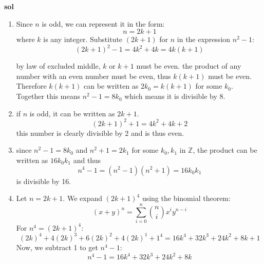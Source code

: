 \documentclass{article}
\begin{document}
\begin{enumerate}
\textbf{sol}
\begin{enumerate}
    \item Since $n$ is odd, we can represent it in the form:$$n = 2k + 1$$where $k$ is any integer. Substitute $(2k + 1)$ for $n$ in the expression $n^2 - 1$:$$(2k + 1)^2 - 1 = 4k^2+4k = 4k(k+1)$$
    
    by law of excluded middle, \(k\) or \(k+1\) must be even. the product of any number with an even number must be even, thus \(k(k+1)\) must be even. Therefore \(k(k+1)\) can be written as \(2k_0 = k(k+1)\) for some \(k_0\). Together this means \(n^2-1 = 8k_0\) which means it is divisible by \(8\). 

    \item if \(n\) is odd, it can be written as \(2k+1\). 
    \begin{equation}
        (2k+1)^2+1 = 4k^2 + 4k + 2
    \end{equation}
    this number is clearly divisible by 2 and is thus even.
    \item 
    since \(n^2-1 = 8k_0\) and \(n^2+1 = 2k_1\) for some \(k_0,k_1\) in \(\mathbb Z\), the product can be written as \(16k_0k_1\) and thus \begin{equation}
        n^4-1 = (n^2 - 1)(n^2 + 1) = 16k_0k_1
    \end{equation}
    is divisible by 16.

    \item Let $n = 2k + 1$. We expand $(2k + 1)^4$ using the binomial theorem:$$(x + y)^n = \sum_{i=0}^{n} \binom{n}{i} x^i y^{n-i}$$
    For $n^4 = (2k + 1)^4$:\begin{equation}
        (2k)^4 + 4(2k)^3 + 6(2k)^2 + 4(2k)^1 + 1^4= 16k^4 + 32k^3 + 24k^2 + 8k + 1
    \end{equation}
    Now, we subtract 1 to get $n^4 - 1$:$$n^4 - 1 = 16k^4 + 32k^3 + 24k^2 + 8k$$


\end{enumerate}
\end{enumerate}
\end{document}
